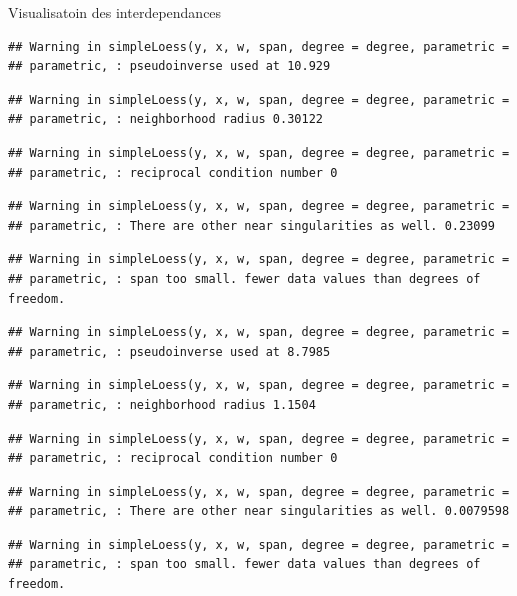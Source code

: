 \documentclass[11pt,ignorenonframetext,]{beamer}
\begin{document}
\begin{frame}[fragile]{Visualisatoin des interdependances}
\begin{verbatim}
## Warning in simpleLoess(y, x, w, span, degree = degree, parametric =
## parametric, : pseudoinverse used at 10.929
\end{verbatim}

\begin{verbatim}
## Warning in simpleLoess(y, x, w, span, degree = degree, parametric =
## parametric, : neighborhood radius 0.30122
\end{verbatim}

\begin{verbatim}
## Warning in simpleLoess(y, x, w, span, degree = degree, parametric =
## parametric, : reciprocal condition number 0
\end{verbatim}

\begin{verbatim}
## Warning in simpleLoess(y, x, w, span, degree = degree, parametric =
## parametric, : There are other near singularities as well. 0.23099
\end{verbatim}

\begin{verbatim}
## Warning in simpleLoess(y, x, w, span, degree = degree, parametric =
## parametric, : span too small. fewer data values than degrees of freedom.
\end{verbatim}

\begin{verbatim}
## Warning in simpleLoess(y, x, w, span, degree = degree, parametric =
## parametric, : pseudoinverse used at 8.7985
\end{verbatim}

\begin{verbatim}
## Warning in simpleLoess(y, x, w, span, degree = degree, parametric =
## parametric, : neighborhood radius 1.1504
\end{verbatim}

\begin{verbatim}
## Warning in simpleLoess(y, x, w, span, degree = degree, parametric =
## parametric, : reciprocal condition number 0
\end{verbatim}

\begin{verbatim}
## Warning in simpleLoess(y, x, w, span, degree = degree, parametric =
## parametric, : There are other near singularities as well. 0.0079598
\end{verbatim}

\begin{verbatim}
## Warning in simpleLoess(y, x, w, span, degree = degree, parametric =
## parametric, : span too small. fewer data values than degrees of freedom.
\end{verbatim}


\end{frame}
\end{document}
